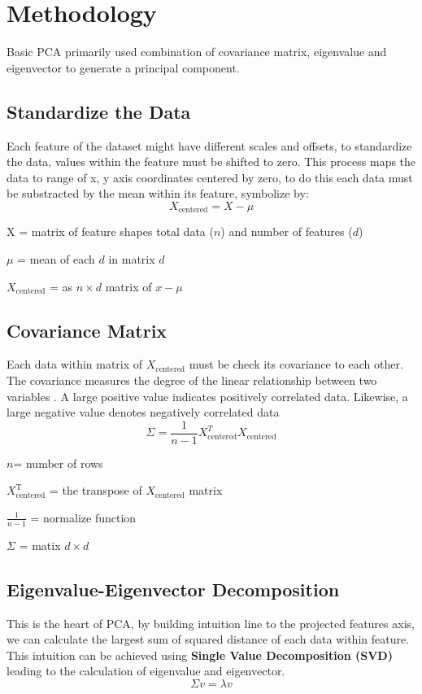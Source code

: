 \documentclass[a4paper,12pt]{article}
\begin{document}
\section{Methodology}
Basic PCA primarily used combination of covariance matrix, eigenvalue and eigenvector to generate a principal component.

\subsection{Standardize the Data}
Each feature of the dataset might have different scales and offsets, to standardize the data, values within the feature must be shifted to zero.
This process maps the data to range of x, y axis coordinates centered by zero, to do this each data must be substracted by the mean within its feature, symbolize by:
\[
X_{\text{centered}} = X - \mu
\]

X = matrix of feature shapes total data ($n$) and number of features ($d$)

$\mu$ = mean of each $d$ in matrix $d$

$X_{\text{centered}}$ = as $n \times d$ matrix of $x - \mu$

\subsection{Covariance Matrix}
Each data within matrix of $X_{\text{centered}}$ must be check its covariance to each other. The covariance measures the degree of the linear relationship
between two variables \cite{shlens2014tutorial}. A large positive value indicates positively correlated data. Likewise, a large negative value denotes negatively correlated data \cite{shlens2014tutorial}
\[
\Sigma = \frac{1}{n-1} X_{\text{centered}}^{T} X_{\text{centered}}
\]

$n$= number of rows

$X_{\text{centered}}^{\text{T}}$ = the transpose of $X_{\text{centered}}$ matrix

$\frac{1}{n-1}$ = normalize function

$\Sigma$ = matix $d \times d$

\subsection{Eigenvalue-Eigenvector Decomposition}
This is the heart of PCA, by building intuition line to the projected features axis, we can calculate the largest sum of squared distance of each data within feature.
This intuition can be achieved using \textbf{Single Value Decomposition (SVD)} leading to the calculation of eigenvalue and eigenvector.
\[
\Sigma v = \lambda v
\]
\end{document}
